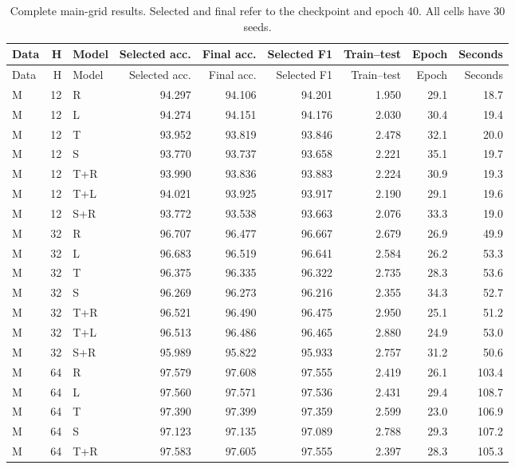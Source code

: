 \small
\begin{longtable}{@{}lrlrrrrrr@{}}
\caption{Complete main-grid results. Selected and final refer to the checkpoint and epoch 40. All cells have 30 seeds.}\label{tab:allmain}\\
\toprule Data & H & Model & Selected acc. & Final acc. & Selected F1 & Train--test & Epoch & Seconds \\
\midrule\endfirsthead
\toprule Data & H & Model & Selected acc. & Final acc. & Selected F1 & Train--test & Epoch & Seconds \\
\midrule\endhead
\bottomrule\endfoot
M & 12 & R & 94.297 & 94.106 & 94.201 & 1.950 & 29.1 & 18.7 \\
M & 12 & L & 94.274 & 94.151 & 94.176 & 2.030 & 30.4 & 19.4 \\
M & 12 & T & 93.952 & 93.819 & 93.846 & 2.478 & 32.1 & 20.0 \\
M & 12 & S & 93.770 & 93.737 & 93.658 & 2.221 & 35.1 & 19.7 \\
M & 12 & T+R & 93.990 & 93.836 & 93.883 & 2.224 & 30.9 & 19.3 \\
M & 12 & T+L & 94.021 & 93.925 & 93.917 & 2.190 & 29.1 & 19.6 \\
M & 12 & S+R & 93.772 & 93.538 & 93.663 & 2.076 & 33.3 & 19.0 \\
\addlinespace
M & 32 & R & 96.707 & 96.477 & 96.667 & 2.679 & 26.9 & 49.9 \\
M & 32 & L & 96.683 & 96.519 & 96.641 & 2.584 & 26.2 & 53.3 \\
M & 32 & T & 96.375 & 96.335 & 96.322 & 2.735 & 28.3 & 53.6 \\
M & 32 & S & 96.269 & 96.273 & 96.216 & 2.355 & 34.3 & 52.7 \\
M & 32 & T+R & 96.521 & 96.490 & 96.475 & 2.950 & 25.1 & 51.2 \\
M & 32 & T+L & 96.513 & 96.486 & 96.465 & 2.880 & 24.9 & 53.0 \\
M & 32 & S+R & 95.989 & 95.822 & 95.933 & 2.757 & 31.2 & 50.6 \\
\addlinespace
M & 64 & R & 97.579 & 97.608 & 97.555 & 2.419 & 26.1 & 103.4 \\
M & 64 & L & 97.560 & 97.571 & 97.536 & 2.431 & 29.4 & 108.7 \\
M & 64 & T & 97.390 & 97.399 & 97.359 & 2.599 & 23.0 & 106.9 \\
M & 64 & S & 97.123 & 97.135 & 97.089 & 2.788 & 29.3 & 107.2 \\
M & 64 & T+R & 97.583 & 97.605 & 97.555 & 2.397 & 28.3 & 105.3 \\

\end{longtable}
